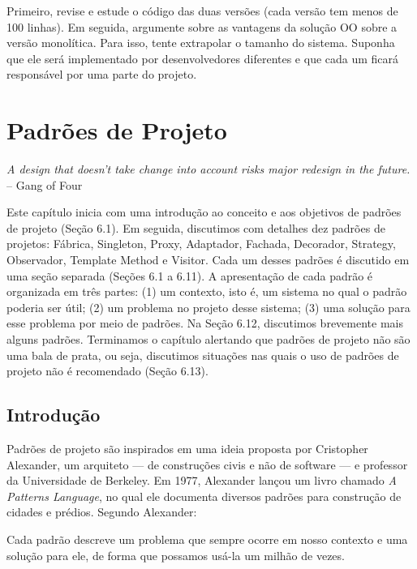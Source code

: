 \documentclass[
  11pt,
  twoside]{book}
\renewenvironment{quote}{\centering \vspace{1.5ex} \begin{tcolorbox}[colback=backcolor, width=4.9in]}{\end{tcolorbox}}
\begin{document}
Primeiro, revise e estude o código das duas versões (cada versão tem
menos de 100 linhas). Em seguida, argumente sobre as vantagens da
solução OO sobre a versão monolítica. Para isso, tente extrapolar o
tamanho do sistema. Suponha que ele será implementado por
desenvolvedores diferentes e que cada um ficará responsável por uma
parte do projeto.

\hypertarget{padruxf5es-de-projeto}{%
\chapter{Padrões de Projeto}\label{padruxf5es-de-projeto}}

\begin{quote}
\emph{A design that doesn't take change into account risks major
redesign in the future.} -- Gang of Four
\end{quote}

Este capítulo inicia com uma introdução ao conceito e aos objetivos de
padrões de projeto (Seção 6.1). Em seguida, discutimos com detalhes dez
padrões de projetos: Fábrica, Singleton, Proxy, Adaptador, Fachada,
Decorador, Strategy, Observador, Template Method e Visitor. Cada um
desses padrões é discutido em uma seção separada (Seções 6.1 a 6.11). A
apresentação de cada padrão é organizada em três partes: (1) um
contexto, isto é, um sistema no qual o padrão poderia ser útil; (2) um
problema no projeto desse sistema; (3) uma solução para esse problema
por meio de padrões. Na Seção 6.12, discutimos brevemente mais alguns
padrões. Terminamos o capítulo alertando que padrões de projeto não são
uma bala de prata, ou seja, discutimos situações nas quais o uso de
padrões de projeto não é recomendado (Seção 6.13).

\hypertarget{introduuxe7uxe3o-3}{%
\section{Introdução}\label{introduuxe7uxe3o-3}}

 

Padrões de projeto são inspirados em uma ideia proposta por Cristopher
Alexander, um arquiteto --- de construções civis e não de software --- e
professor da Universidade de Berkeley. Em 1977, Alexander lançou um
livro chamado \emph{A Patterns Language}, no qual ele documenta diversos
padrões para construção de cidades e prédios. Segundo Alexander:

\begin{quote}
Cada padrão descreve um problema que sempre ocorre em nosso contexto e
uma solução para ele, de forma que possamos usá-la um milhão de vezes.
\end{quote}
\end{document}
